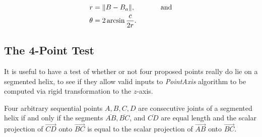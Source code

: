 \documentclass[mathematics,article,submit,pdftex,moreauthors]{Definitions/mdpi}
\DeclarePairedDelimiter{\norm}{\lVert}{\rVert}
\begin{document}
\begin{align}
  r &= \norm{B - B_a}, \text{ \hspace{3em} and}  \\
  \theta &= 2 \arcsin{\frac{c}{2r}}.
\end{align}


\subsection{The 4-Point Test}

It is useful to have a test of whether or not four proposed points really do lie on a segmented helix, to see
if they allow valid inputs to {\em PointAxis} algorithm to be computed via rigid
transformation to the $z$-axis.

\begin{Theorem}
  Four arbitrary sequential points $A,B,C,D$ are consecutive joints of a segmented helix if and only if
  the segments $\overline{AB},\overline{BC}$, and $\overline{CD}$ are equal length and the scalar projection
  of $\overrightarrow{CD}$ onto $\overrightarrow{BC}$ is equal to the scalar projection of $\overrightarrow{AB}$
  onto $\overrightarrow{BC}$.
\end{Theorem}
\end{document}
